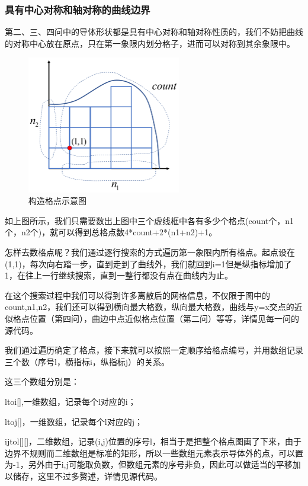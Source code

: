 \documentclass[10pt, a4paper]{article}
\begin{document}
    \subsubsection{具有中心对称和轴对称的曲线边界}

    第二、三、四问中的导体形状都是具有中心对称和轴对称性质的，我们不妨把曲线的对称中心放在原点，只在第一象限内划分格子，进而可以对称到其余象限中。

    \begin{figure}[H]
        \centering
        \includegraphics[width=0.6\textwidth]{构造格点示意图.png}
        \caption{构造格点示意图}\label{fig:构造格点示意图}
    \end{figure}

    如上图所示，我们只需要数出上图中三个虚线框中各有多少个格点(count个，n1个，n2个)，就可以得到总格点数4*count+2*(n1+n2)+1。

    怎样去数格点呢？我们通过逐行搜索的方式遍历第一象限内所有格点。起点设在(1,1)，每次向右踏一步，直到走到了曲线外，我们就回到i=1但是纵指标增加了1，在往上一行继续搜索，直到一整行都没有点在曲线内为止。

    在这个搜索过程中我们可以得到许多离散后的网格信息，不仅限于图中的count,n1,n2，我们还可以得到横向最大格数，纵向最大格数，曲线与y=x交点的近似格点位置（第四问），曲边中点近似格点位置（第二问）等等，详情见每一问的源代码。

    我们通过遍历确定了格点，接下来就可以按照一定顺序给格点编号，并用数组记录三个数（序号l，横指标i，纵指标j）的关系。

    这三个数组分别是：
    
    ltoi[],一维数组，记录每个l对应的i；
    
    ltoj[]，一维数组，记录每个l对应的j；
    
    ijtol[][]，二维数组，记录(i,j)位置的序号l，相当于是把整个格点图画了下来，由于边界不规则而二维数组是标准的矩形，所以一些数组元素表示导体外的点，可以置为-1，另外由于i,j可能取负数，但数组元素的序号非负，因此可以做适当的平移加以储存，这里不过多赘述，详情见源代码。
\end{document}
